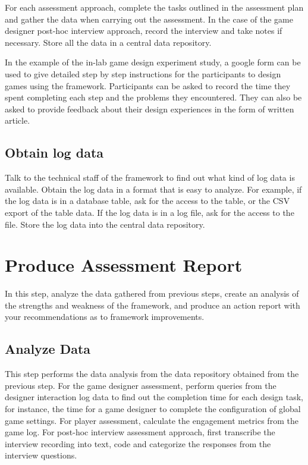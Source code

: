 For each assessment approach, complete the tasks outlined in the assessment plan and gather the data when carrying out the 
assessment. In the case of the game designer post-hoc interview approach, record the interview and take notes if necessary. 
Store all the data in a central data repository. 

In the example of the in-lab game design experiment study, a google form can be used  to give detailed step by step 
instructions for the participants to design games using the framework. Participants can be asked to record the time they spent completing 
each step and the problems they encountered. They can also be asked to provide feedback about their design experiences
in the form of written article. 

\subsection{Obtain log data}

Talk to the technical staff of the framework to find out what kind of log data is available. Obtain the log data in a format that 
is easy to analyze. For example, if the log data is in a database table, ask for the access to the table, or the CSV export of 
the table data. If the log data is in a log file, ask for the access to the file. Store the log data into the central data repository.

\section{Produce Assessment Report}

In this step, analyze the data gathered from previous steps,
create an analysis of the strengths and weakness of the framework, 
and produce an action report with your recommendations as to framework improvements.

\subsection{Analyze Data}

This step performs the data analysis from the data repository obtained from the previous step. For the game designer assessment, 
perform queries from the designer interaction log data to find out the completion time for each design task, for instance, the 
time for a game designer to complete the configuration of global game settings. For player assessment, calculate the 
engagement metrics from the game log. For post-hoc interview assessment approach, first transcribe the interview recording into 
text, code and categorize the responses from the interview questions. 

